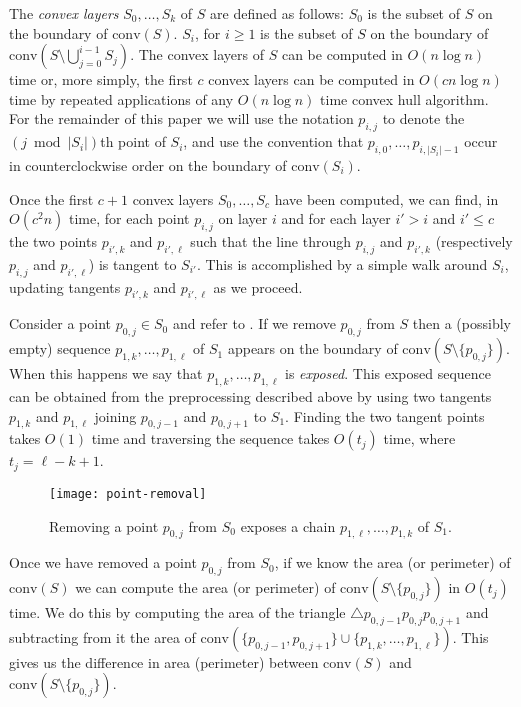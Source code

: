 \documentclass{elsart}
\newcommand{\ch}{\mathrm{conv}}
\begin{document}
The \emph{convex layers} $S_0,\ldots,S_k$ of $S$ are defined as
follows: $S_0$ is the subset of $S$ on the boundary of $\ch(S)$.
$S_i$, for $i\ge 1$ is the subset of $S$ on the boundary of
$\ch(S\setminus\bigcup_{j=0}^{i-1} S_j)$.  The convex layers of $S$
can be computed in $O(n\log n)$ time \cite{c85,hs92} or, more simply,
the first $c$ convex layers can be computed in $O(cn\log n)$ time by
repeated applications of any $O(n\log n)$ time convex hull algorithm.
For the remainder of this paper we will use the notation $p_{i,j}$ to
denote the $(j\bmod |S_i|)$th point of $S_i$, and use the convention
that $p_{i,0},\ldots,p_{i,|S_i|-1}$ occur in counterclockwise order on
the boundary of $\ch(S_i)$.

Once the first $c+1$ convex layers $S_0,\ldots,S_c$ have been
computed, we can find, in $O(c^2 n)$ time, for each point $p_{i,j}$ on
layer $i$ and for each layer $i'> i$ and $i'\le c$ the two points
$p_{i',k}$ and $p_{i',\ell}$ such that the line through $p_{i,j}$ and
$p_{i',k}$ (respectively $p_{i,j}$ and $p_{i',\ell}$) is tangent to
$S_{i'}$.  This is accomplished by a simple walk around $S_i$,
updating tangents $p_{i',k}$ and $p_{i',\ell}$ as we proceed.

Consider a point $p_{0,j}\in S_0$ and refer to .
If we remove $p_{0,j}$ from $S$ then a (possibly empty) sequence
$p_{1,k},\ldots,p_{1,\ell}$ of $S_1$ appears on the boundary of
$\ch(S\setminus\{p_{0,j}\})$.  When this happens we say that
$p_{1,k},\ldots,p_{1,\ell}$ is \emph{exposed}.  This exposed sequence
can be obtained from the preprocessing described above by using two
tangents $p_{1,k}$ and $p_{1,\ell}$ joining $p_{0,j-1}$ and
$p_{0,j+1}$ to $S_1$.  Finding the two tangent points takes $O(1)$
time and traversing the sequence takes $O(t_j)$ time, where
$t_j=\ell-k+1$.

\begin{figure}
\begin{center}\texttt{[image: point-removal]}\end{center}
\caption{Removing a point $p_{0,j}$ from $S_0$ exposes a chain
$p_{1,\ell},\ldots,p_{1,k}$ of $S_1$.}
\end{figure}

Once we have removed a point $p_{0,j}$ from $S_0$, if we know the area
(or perimeter) of $\ch(S)$ we can compute the area (or perimeter) of
$\ch(S\setminus\{p_{0,j}\})$ in $O(t_j)$ time.  We do this by
computing the area of the triangle $\triangle
p_{0,j-1}p_{0,j}p_{0,j+1}$ and subtracting from it the area of
$\ch(\{p_{0,j-1},p_{0,j+1}\}\cup\{p_{1,k},\ldots,p_{1,\ell}\})$.  This
gives us the difference in area (perimeter) between $\ch(S)$ and
$\ch(S\setminus\{p_{0,j}\})$.
\end{document}
